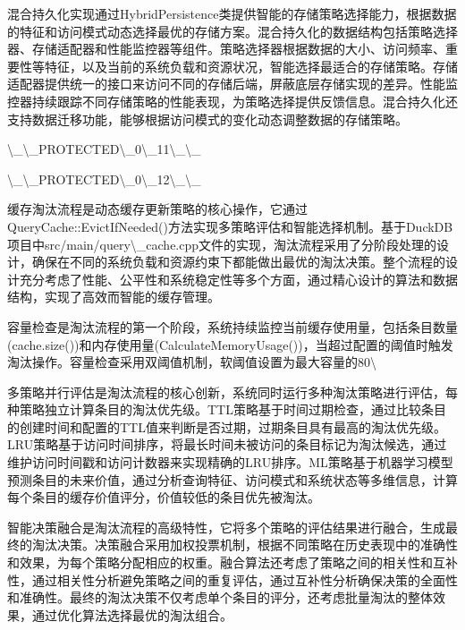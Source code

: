 混合持久化实现通过HybridPersistence类提供智能的存储策略选择能力，根据数据的特征和访问模式动态选择最优的存储方案。混合持久化的数据结构包括策略选择器、存储适配器和性能监控器等组件。策略选择器根据数据的大小、访问频率、重要性等特征，以及当前的系统负载和资源状况，智能选择最适合的存储策略。存储适配器提供统一的接口来访问不同的存储后端，屏蔽底层存储实现的差异。性能监控器持续跟踪不同存储策略的性能表现，为策略选择提供反馈信息。混合持久化还支持数据迁移功能，能够根据访问模式的变化动态调整数据的存储策略。

\textbackslash{}_\textbackslash{}_PROTECTED\textbackslash{}_0\textbackslash{}_11\textbackslash{}_\textbackslash{}_

\textbackslash{}_\textbackslash{}_PROTECTED\textbackslash{}_0\textbackslash{}_12\textbackslash{}_\textbackslash{}_

缓存淘汰流程是动态缓存更新策略的核心操作，它通过QueryCache::EvictIfNeeded()方法实现多策略评估和智能选择机制。基于DuckDB项目中src/main/query\textbackslash{}_cache.cpp文件的实现，淘汰流程采用了分阶段处理的设计，确保在不同的系统负载和资源约束下都能做出最优的淘汰决策。整个流程的设计充分考虑了性能、公平性和系统稳定性等多个方面，通过精心设计的算法和数据结构，实现了高效而智能的缓存管理。

容量检查是淘汰流程的第一个阶段，系统持续监控当前缓存使用量，包括条目数量(cache.size())和内存使用量(CalculateMemoryUsage())，当超过配置的阈值时触发淘汰操作。容量检查采用双阈值机制，软阈值设置为最大容量的80\textbackslash{}%

多策略并行评估是淘汰流程的核心创新，系统同时运行多种淘汰策略进行评估，每种策略独立计算条目的淘汰优先级。TTL策略基于时间过期检查，通过比较条目的创建时间和配置的TTL值来判断是否过期，过期条目具有最高的淘汰优先级。LRU策略基于访问时间排序，将最长时间未被访问的条目标记为淘汰候选，通过维护访问时间戳和访问计数器来实现精确的LRU排序。ML策略基于机器学习模型预测条目的未来价值，通过分析查询特征、访问模式和系统状态等多维信息，计算每个条目的缓存价值评分，价值较低的条目优先被淘汰。

智能决策融合是淘汰流程的高级特性，它将多个策略的评估结果进行融合，生成最终的淘汰决策。决策融合采用加权投票机制，根据不同策略在历史表现中的准确性和效果，为每个策略分配相应的权重。融合算法还考虑了策略之间的相关性和互补性，通过相关性分析避免策略之间的重复评估，通过互补性分析确保决策的全面性和准确性。最终的淘汰决策不仅考虑单个条目的评分，还考虑批量淘汰的整体效果，通过优化算法选择最优的淘汰组合。

